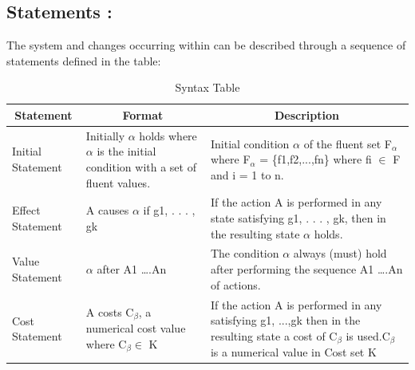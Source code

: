 \documentclass[11pt]{article}
\begin{document}
\subsection{Statements :}\label{sec:Statements} 
	The system and changes occurring within can be described through a sequence of statements defined in the table:
	\begin{table}[H]
  \centering
    \begin{tabular}{|p{2cm}|p{4cm}|p{9cm}|}
    \hline
    \multicolumn{1}{|c|}{\textbf{Statement}} & \multicolumn{1}{c|}{\textbf{Format}} & \multicolumn{1}{c|}{\textbf{Description}} \\
    \hline
    Initial Statement & Initially $\alpha$ holds where $\alpha$ is the initial condition with a set of fluent values. & Initial condition $\alpha$ of the fluent set F$_{\alpha}$ where  F$_{\alpha}$ = \{f1,f2,...,fn\} where  fi $\in$ F and i = 1 to n. \\
    \hline
    Effect Statement & A causes $\alpha$ if g1, . . . , gk & If the action A is performed in any state satisfying g1, . . . , gk, then in
    the resulting state $\alpha$ holds. \\
    \hline
    Value Statement & $\alpha$ after A1 ….An & The condition $\alpha$ always (must) hold after performing the sequence A1 ….An of actions. \\
    \hline
    Cost Statement & A costs C$_{\beta}$, a numerical cost value where C$_{\beta} \in $ K   & If the action A is performed in any satisfying g1, ...,gk then in the resulting state a cost of C$_{\beta}$ is used.C$_{\beta}$ is a numerical value in Cost set K\\
    \hline
    \end{tabular}
    \caption{Syntax Table}
  \label{tab:table01}
\end{table}
\end{document}
